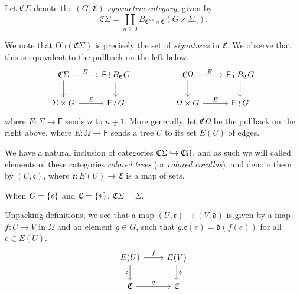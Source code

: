 \documentclass[a4paper,10pt
,draft
]{article}%
\renewcommand{\1}{\ensuremath{\mathbb{id}}}
\begin{document}
\begin{definition}
      Let $\mathfrak C \Sigma$ denote the \textit{$(G,\mathfrak C)$-symmetric category}, given by
      \begin{equation}
            \mathfrak C \Sigma = \coprod\limits_{n\geq 0} B_{\mathfrak C^{\times n} \times \mathfrak C}(G \times \Sigma_n).
      \end{equation}
      
      We note that $\mathrm{Ob}(\mathfrak C \Sigma)$ is precisely the set of \textit{signatures} in $\mathfrak C$.
      We observe that this is equivalent to the pullback on the left below.
      \begin{equation}
            \label{COMEGA_B_EQ}
            \begin{tikzcd}
                  \mathfrak C \Sigma \arrow[d] \arrow[r, "E"]
                  &
                  \mathsf F \wr B_{\mathfrak C}G \arrow[d]
                  &&
                  \mathfrak C \Omega \arrow[d] \arrow[r, "E"]
                  &
                  \mathsf F \wr B_{\mathfrak C}G \arrow[d]
                  \\
                  \Sigma \times G \arrow[r, "E"]
                  &
                  \mathsf F \wr G
                  &&
                  \Omega \times G \arrow[r, "E"]
                  &
                  \mathsf F \wr G
            \end{tikzcd}
      \end{equation}
      where $E: \Sigma \to \mathsf F$ sends $\underline{n}$ to $\underline{n+1}$.
      More generally, let $\mathfrak C \Omega$ be the pullback on the right above,
      where $E: \Omega \to \mathsf F$ sends a tree $U$ to its set $E(U)$ of edges.

      We have a natural inclusion of categories $\mathfrak C \Sigma \hookrightarrow \mathfrak C \Omega$,
      and as such we will called elements of these categories
      \textit{colored trees} (or \textit{colored corollas}),
      and denote them by $(U,\mathfrak c)$, where $\mathfrak c: E(U) \to \mathfrak C$ is a map of sets.
\end{definition}

\begin{remark}
      When $G = \left\{e\right\}$ and $\mathfrak C = \left\{*\right\}$, $\mathfrak C \Sigma = \Sigma$.
\end{remark}

Unpacking definitions, we see that a map $(U, \mathfrak c) \to (V, \mathfrak d)$ is given by
a map $f: U \to V$ in $\Omega$ and an element $g\in G$,
such that $g.\mathfrak c(e) = \mathfrak d(f(e))$ for all $e \in E(U)$.
\begin{equation}
      \begin{tikzcd}
            E(U) \arrow[r, "f"] \arrow[d, "\mathfrak c"']
            &
            E(V) \arrow[d, "\mathfrak d"]
            \\
            \mathfrak C \arrow[r, "g"]
            &
            \mathfrak C
      \end{tikzcd}
\end{equation}
\end{document}
